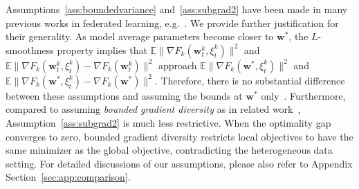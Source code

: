 Assumptions~\ref{ass:boundedvariance} and~\ref{ass:subgrad2} have been made in many previous
works in federated learning, e.g.~\cite{yu2019parallel,li2019convergence,stich2018local}. We provide further justification for their generality. As model average parameters become
closer to $\mathbf{w}^{\ast}$, the $L$-smoothness property implies
that $\mathbb{E}\|\nabla F_{k}(\mathbf{w}_{t}^{k},\xi_{t}^{k})\|^{2}$
and $\mathbb{E}\|\nabla F_{k}(\mathbf{w}_{t}^{k},\xi_{t}^{k})-\nabla F_{k}(\mathbf{w}_{t}^{k})\|^{2}$
approach $\mathbb{E}\|\nabla F_{k}(\mathbf{w}^{\ast},\xi_{t}^{k})\|^{2}$
and $\mathbb{E}\|\nabla F_{k}(\mathbf{w}^{\ast},\xi_{t}^{k})-\nabla F_{k}(\mathbf{w}^{\ast})\|^{2}$.
Therefore, there is no substantial difference between these assumptions
and assuming the bounds at $\mathbf{w}^{\ast}$ only~\cite{koloskova2020unified}. Furthermore, compared to assuming \textit{bounded gradient diversity} as in related work~\cite{haddadpour2019convergence,li2018federated}, Assumption~\ref{ass:subgrad2} is much less restrictive. When the optimality gap converges to zero,
bounded gradient diversity restricts local objectives to have the same minimizer as the global objective, contradicting the heterogeneous data setting. 
For detailed discussions of our assumptions, please also refer to Appendix Section~\ref{sec:app:comparison}.